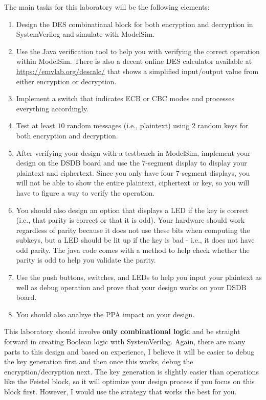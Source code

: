 \documentclass{article}
\begin{document}
The main tasks for this laboratory
will be the following elements:
\begin{enumerate}
  \item Design the DES combinatianal block for both encryption and
    decryption in SystemVerilog and simulate with ModelSim.
  \item Use the Java verification tool to help you with verifying the
    correct operation within ModelSim.  There is also a decent online
    DES calculator available at \url{https://emvlab.org/descalc/} that
    shows a simplified input/output value from either encryption or decryption.  
  \item Implement a switch that indicates ECB or CBC modes and
    processes everything accordingly.
  \item Test at least $10$ random messages (i.e., plaintext) using
    $2$ random keys for both encryption and decryption.
  \item After verifying your design with a testbench in ModelSim,
    implement your design on the DSDB board and use the    
    $7$-segment display to display your plaintext and ciphertext.
    Since you only have four $7$-segment displays, you will not be
    able to show the entire plaintext, ciphertext or key, so you will
    have to figure a way to verify the operation.
  \item You should also design an option that displays a LED if the
      key is correct (i.e., that parity is correct or that it is
      odd).  Your hardware should work regardless of parity because it
      does not use these bits when computing the subkeys, but a LED
      should be lit up if the key is bad - i.e., it does not have odd
      parity.  The java code comes with a method to help check whether
      the parity is odd to help you validate the parity.
  \item Use the push buttons, switches, and LEDs to help you input
    your plaintext as well as debug operation and prove that your
    design works on your DSDB board.
    \item You should also analzye the PPA impact on your design. 
\end{enumerate}
This laboratory should involve \textbf{only combinational logic} and be
straight forward in creating Boolean logic with SystemVerilog.
Again, there are many parts to this design and based on experience, I
believe it will be easier to debug the key generation first and then
once this works, debug the encryption/decryption next.  The key
generation is slightly easier than operations like the Feistel block,
so it will optimize your design process if you focus on this block
first.  However, I would use the strategy that works the best for you.
\end{document}
